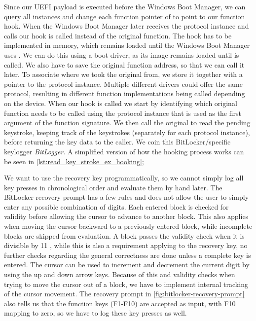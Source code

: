 Since our \ac{UEFI} payload is executed before the Windows Boot Manager, we can query all  instances and change each function pointer of  to point to our function hook.
When the Windows Boot Manager later receives the protocol instance and calls  our hook is called instead of the original function.
The hook has to be implemented in memory, which remains loaded until the Windows Boot Manager uses .
We can do this using a boot driver, as its image remains loaded until  is called.
We also have to save the original function address, so that we can call it later.
To associate where we took the original from, we store it together with a pointer to the protocol instance.
Multiple different drivers could offer the same protocol, resulting in different function implementations being called depending on the device.
When our hook is called we start by identifying which original function needs to be called using the protocol instance that is used as the first argument of the  function signature.
We then call the original to read the pending keystroke, keeping track of the keystrokes (separately for each protocol instance), before returning the key data to the caller.
We coin this BitLocker\-/specific keylogger \emph{BitLogger}.
A simplified version of how the hooking process works can be seen in \autoref{lst:read_key_stroke_ex_hooking};

\vspace{1em}



We want to use the recovery key programmatically, so we cannot simply log all key presses in chronological order and evaluate them by hand later.
The BitLocker recovery prompt has a few rules and does not allow the user to simply enter any possible combination of digits.
Each entered block is checked for validity before allowing the cursor to advance to another block.
This also applies when moving the cursor backward to a previously entered block, while incomplete blocks are skipped from evaluation.
A block passes the validity check when it is divisible by 11 \cite[Section 9]{windows-internals-6-part2}, while this is also a requirement applying to the recovery key, no further checks regarding the general correctness are done unless a complete key is entered.
The cursor can be used to increment and decrement the current digit by using the up and down arrow keys.
Because of this and validity checks when trying to move the cursor out of a block, we have to implement internal tracking of the cursor movement.
The recovery prompt in \autoref{fig:bitlocker-recovery-prompt} also tells us that the function keys (F1-F10) are accepted as input, with F10 mapping to zero, so we have to log these key presses as well.

